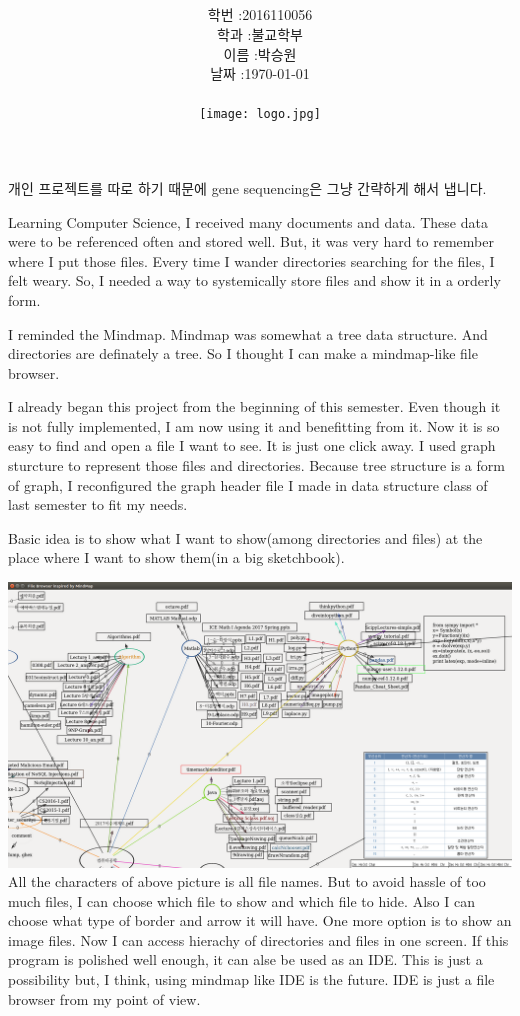 \documentclass[12pt,a4paper]{article}
\title{
	\centering
	\pgfornament[width=12cm,color=teal]{84}\\
	\vspace{1cm}
	\fontsize{50}{50} \selectfont {File Browser\\inspired by MindMap}
		\pgfornament[width=12cm,color=teal]{88}\\
	\vfill}
\author{
	\LARGE
	\begin{tabular}{rl}
		\hline
		학번 : & 2016110056\\ 
		학과 : & 불교학부 \\
		이름 : & 박승원\\
		날짜 : & \today\\
		\hline
	\end{tabular}\vspace{2cm}
	\\
\texttt{[image: logo.jpg]}
	}
\date{}
\begin{document}
\maketitle
{}
\noindent
\lstset{language=C++, columns=flexible, tabsize=4, frame=shadowbox, showstringspaces=false, breaklines=true, upquote=true, basicstyle=\normalsize}
{\LARGE	개인 프로젝트를 따로 하기 때문에 gene sequencing은 그냥 간략하게 해서 냅니다.}	

\newpage
Learning Computer Science, I received many documents and data.
These data were to be referenced often and stored well.
But, it was very hard to remember where I put those files.
Every time I wander directories searching for the files, I felt weary.
So, I needed a way to systemically store files and show it in a orderly form.

I reminded the Mindmap. 
Mindmap was somewhat a tree data structure.
And directories are definately a tree.
So I thought I can make a mindmap-like file browser.

I already began this project from the beginning of this semester.
Even though it is not fully implemented, I am now using it and benefitting from it.
Now it is so easy to find and open a file I want to see. 
It is just one click away.
I used graph sturcture to represent those files and directories.
Because tree structure is a form of graph, I reconfigured the graph header file I made in data structure class of last semester to fit my needs.

Basic idea is to show what I want to show(among directories and files) at the place where I want to show them(in a big sketchbook).

\includegraphics[width=\textwidth]{1.png}
All the characters of above picture is all file names.
But to avoid hassle of too much files, I can choose which file to show and which file to hide.
Also I can choose what type of border and arrow it will have.
One more option is to show an image files.
Now I can access hierachy of directories and files in one screen.
\newpage
If this program is polished well enough, it can alse be used as an IDE.
This is just a possibility but, I think, using mindmap like IDE is the future.
IDE is just a file browser from my point of view.
\end{document}
